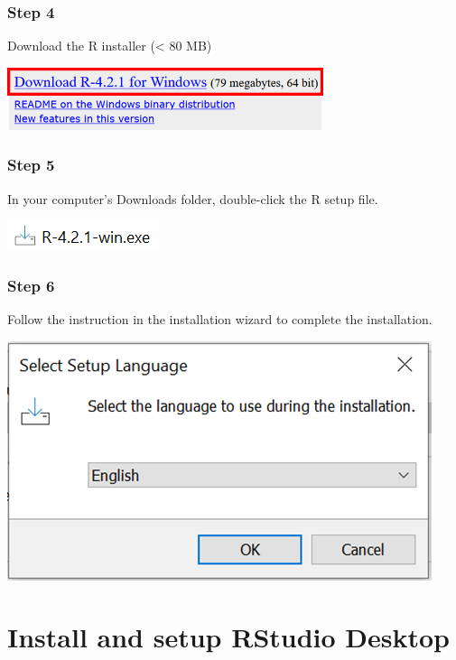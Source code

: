 \documentclass[
  letterpaper,
  DIV=11,
  numbers=noendperiod]{scrreprt}
\begin{document}
\hypertarget{step-4}{%
\subsubsection{Step 4}\label{step-4}}

Download the R installer (\textless{} 80 MB)

\includegraphics[width=3.64583in,height=\textheight]{./images/paste-9624855F.png}

\hypertarget{step-5}{%
\subsubsection{Step 5}\label{step-5}}

In your computer's Downloads folder, double-click the R setup file.

\includegraphics{./images/paste-FD7C97A4.png}

\hypertarget{step-6}{%
\subsubsection{Step 6}\label{step-6}}

Follow the instruction in the installation wizard to complete the
installation.

\includegraphics{./images/paste-0F242DBF.png}

\hypertarget{sec-RStudio-installation}{%
\section{Install and setup RStudio
Desktop}\label{sec-RStudio-installation}}
\end{document}
